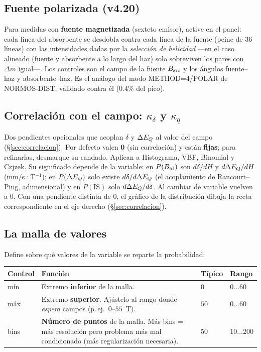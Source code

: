 \subsection{Fuente polarizada (v4.20)}
\label{sec:fuente-polarizada}

Para medidas con \textbf{fuente magnetizada} (sexteto emisor), active
 en el panel: cada línea del absorbente se desdobla
contra cada línea de la fuente (peine de 36 líneas) con las intensidades
dadas por la \emph{selección de helicidad} —en el caso alineado
(fuente y absorbente a lo largo del haz) solo sobreviven los pares con
$\Delta m$ igual—. Los controles son el campo de la fuente $B_{\rm src}$ y
los ángulos fuente--haz y absorbente--haz. Es el análogo del modo
METHOD=4/POLAR de NORMOS-DIST, validado contra él (0.4\% del pico).

\subsection{Correlación con el campo: $\kappa_\delta$ y $\kappa_q$}

Dos pendientes opcionales que acoplan $\delta$ y $\Delta E_{Q}$ al valor del campo
(§\ref{sec:correlacion}). Por defecto valen \textbf{0} (sin correlación) y están
\textbf{fijas}; para refinarlas, desmarque su candado. Aplican a Histograma, VBF,
Binomial y Czjzek. Su significado depende de la variable: en $P(B_{\mathrm{hf}})$ son $d\delta/dH$ y
$d\Delta E_{Q}/dH$ (mm/s·T$^{-1}$); en $P(\Delta E_{Q})$ solo existe $d\delta/d\Delta E_{Q}$ (el
acoplamiento de Rancourt--Ping, adimensional) y en $P(\text{IS})$ solo
$d\Delta E_{Q}/d\delta$. Al cambiar de variable vuelven a 0. Con una pendiente distinta
de 0, el gráfico de la distribución dibuja la recta correspondiente en el eje
derecho (§\ref{sec:correlacion}).

\subsection{La malla de valores}

Define sobre qué valores de la variable se reparte la probabilidad:

\begin{center}
\begin{tabular}{@{}lp{}ll@{}}
\toprule
\textbf{Control} & \textbf{Función} & \textbf{Típico} & \textbf{Rango} \\
\midrule
mín & Extremo \textbf{inferior} de la malla. & $0$ & $0\ldots60$ \\[3pt]
máx & Extremo \textbf{superior}. Ajústelo al rango donde \emph{espera} campos
(p.\,ej.\ $0$--$55$~T). & $50$ & $0\ldots60$ \\[3pt]
bins & \textbf{Número de puntos} de la malla. Más bins = más resolución pero
problema más mal condicionado (más regularización necesaria). & $50$ & $10\ldots200$ \\
\bottomrule
\end{tabular}
\end{center}

